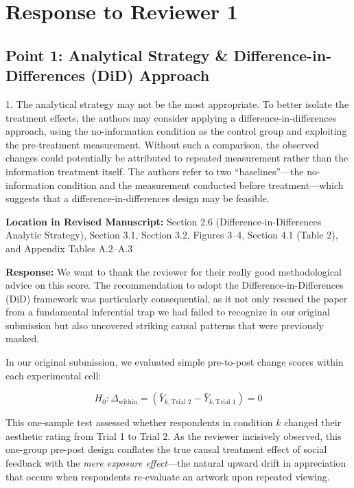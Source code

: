 \documentclass[11pt, letterpaper]{article}
\begin{document}
\section*{Response to Reviewer 1}

\subsection*{Point 1: Analytical Strategy \& Difference-in-Differences (DiD) Approach}

\begin{reviewercomment}
1. The analytical strategy may not be the most appropriate. To better isolate the treatment effects, the authors may consider applying a difference-in-differences approach, using the no-information condition as the control group and exploiting the pre-treatment measurement. Without such a comparison, the observed changes could potentially be attributed to repeated measurement rather than the information treatment itself. The authors refer to two ``baselines''---the no-information condition and the measurement conducted before treatment---which suggests that a difference-in-differences design may be feasible.
\end{reviewercomment}

\textbf{Location in Revised Manuscript:} Section 2.6 (Difference-in-Differences Analytic Strategy), Section 3.1, Section 3.2, Figures 3--4, Section 4.1 (Table 2), and Appendix Tables A.2--A.3

\textbf{Response:}
We want to thank the reviewer for their really good methodological advice on this score. The recommendation to adopt the Difference-in-Differences (DiD) framework was particularly consequential, as it not only rescued the paper from a fundamental inferential trap we had failed to recognize in our original submission but also uncovered striking causal patterns that were previously masked.

In our original submission, we evaluated simple pre-to-post change scores within each experimental cell:

\begin{equation*}
H_0: \Delta_{\text{within}} = (\bar{Y}_{k, \text{Trial 2}} - \bar{Y}_{k, \text{Trial 1}}) = 0
\end{equation*}

This one-sample test assessed whether respondents in condition $k$ changed their aesthetic rating from Trial 1 to Trial 2. As the reviewer incisively observed, this one-group pre-post design conflates the true causal treatment effect of social feedback with the \textit{mere exposure effect}---the natural upward drift in appreciation that occurs when respondents re-evaluate an artwork upon repeated viewing.
\end{document}
